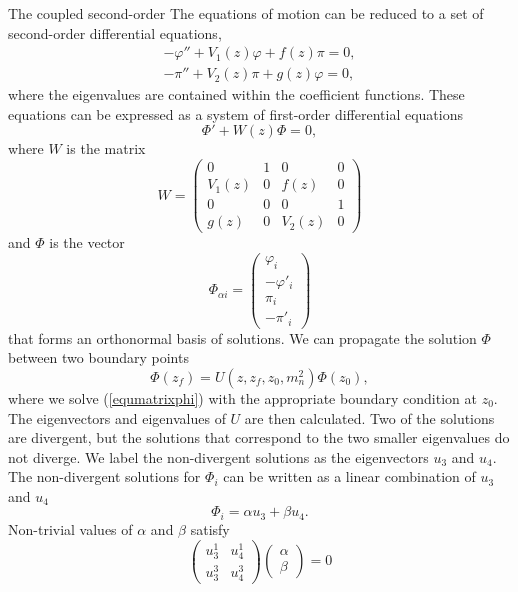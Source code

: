 The coupled second-order 
The equations of motion can be reduced to a set of second-order differential equations,
\begin{eqnarray}
-\varphi'' + V_1(z)  \varphi + f(z)\pi  = 0, \label{equphiAppend}\\
-\pi'' + V_2(z) \pi + g(z)\varphi = 0, \label{equpiAppend}
\end{eqnarray}
where the eigenvalues are contained within the coefficient functions. 
These equations can be expressed as a system of first-order differential equations
\begin{equation} \label{equmatrixphi}
\Phi' + W(z) \Phi = 0,
\end{equation}
where $W$ is the matrix
\begin{equation}
W = \left(\begin{array}{cccc}
0     & 1     & 0     & 0 \\ 
V_1(z)& 0     &   f(z)& 0 \\
0     & 0     & 0     & 1 \\
g(z)  & 0     & V_2(z)& 0
\end{array}\right)
\end{equation}
and $\Phi$ is the vector
\begin{equation}
\Phi_{\alpha i} = \left(\begin{array}{c} \varphi_{i} \\
			-\varphi'_{i} \\
			\pi_{i} \\
			-\pi'_{i} \end{array}\right)		
\end{equation}
that forms an orthonormal basis of solutions. 
We can propagate the solution $\Phi$ between two boundary points
\begin{equation}
\Phi(z_f) = U(z, z_f, z_0, m_n^2)\Phi(z_0),
\end{equation}
where we solve (\ref{equmatrixphi}) with the appropriate boundary condition at $z_0$. 
The eigenvectors and eigenvalues of $U$ are then calculated. 
Two of the solutions are divergent, but the solutions that correspond to the two smaller eigenvalues do not diverge.
We label the non-divergent solutions as the eigenvectors $u_3$ and $u_4$. 
The non-divergent solutions for $\Phi_{i}$ can be written as a linear combination of $u_3$ and $u_4$
\begin{equation}
\Phi_{i} = \alpha u_3 + \beta u_4.
\end{equation}   
Non-trivial values of  $\alpha$ and $\beta$ satisfy
\begin{equation}\label{equNontrivial1}
\left(\begin{array}{cc} u_3^1 & u_4^1 \\ u_3^{3} & u_4^{3} \end{array}\right)\left(\begin{array}{c} \alpha \\ \beta\end{array}\right) = 0
\end{equation}
